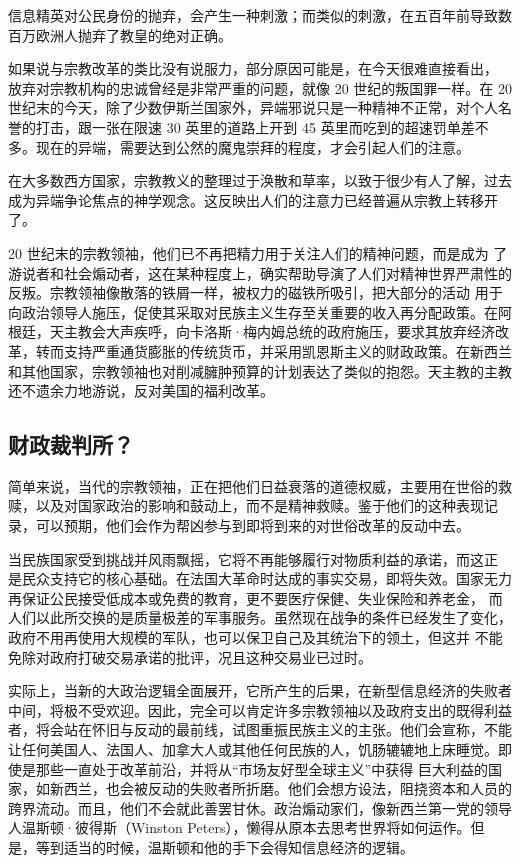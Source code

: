 信息精英对公民身份的抛弃，会产生一种刺激；而类似的刺激，在五百年前导致数百万欧洲人抛弃了教皇的绝对正确。

如果说与宗教改革的类比没有说服力，部分原因可能是，在今天很难直接看出， 放弃对宗教机构的忠诚曾经是非常严重的问题，就像 20 世纪的叛国罪一样。在 20 世纪末的今天，除了少数伊斯兰国家外，异端邪说只是一种精神不正常，对个人名誉的打击，跟一张在限速 30 英里的道路上开到 45 英里而吃到的超速罚单差不多。现在的异端，需要达到公然的魔鬼崇拜的程度，才会引起人们的注意。

在大多数西方国家，宗教教义的整理过于涣散和草率，以致于很少有人了解，过去成为异端争论焦点的神学观念。这反映出人们的注意力已经普遍从宗教上转移开了。

20 世纪末的宗教领袖，他们已不再把精力用于关注人们的精神问题，而是成为 了游说者和社会煽动者，这在某种程度上，确实帮助导演了人们对精神世界严肃性的反叛。宗教领袖像散落的铁屑一样，被权力的磁铁所吸引，把大部分的活动 用于向政治领导人施压，促使其采取对民族主义生存至关重要的收入再分配政策。在阿根廷，天主教会大声疾呼，向卡洛斯·梅内姆总统的政府施压，要求其放弃经济改革，转而支持严重通货膨胀的传统货币，并采用凯恩斯主义的财政政策。在新西兰和其他国家，宗教领袖也对削减臃肿预算的计划表达了类似的抱怨。天主教的主教还不遗余力地游说，反对美国的福利改革。

\subsection{财政裁判所？}
简单来说，当代的宗教领袖，正在把他们日益衰落的道德权威，主要用在世俗的救赎，以及对国家政治的影响和鼓动上，而不是精神救赎。鉴于他们的这种表现记录，可以预期，他们会作为帮凶参与到即将到来的对世俗改革的反动中去。

当民族国家受到挑战并风雨飘摇，它将不再能够履行对物质利益的承诺，而这正 是民众支持它的核心基础。在法国大革命时达成的事实交易，即将失效。国家无力再保证公民接受低成本或免费的教育，更不要医疗保健、失业保险和养老金， 而人们以此所交换的是质量极差的军事服务。虽然现在战争的条件已经发生了变化，政府不用再使用大规模的军队，也可以保卫自己及其统治下的领土，但这并 不能免除对政府打破交易承诺的批评，况且这种交易业已过时。

实际上，当新的大政治逻辑全面展开，它所产生的后果，在新型信息经济的失败者中间，将极不受欢迎。因此，完全可以肯定许多宗教领袖以及政府支出的既得利益者，将会站在怀旧与反动的最前线，试图重振民族主义的主张。他们会宣称，不能让任何美国人、法国人、加拿大人或其他任何民族的人，饥肠辘辘地上床睡觉。即使是那些一直处于改革前沿，并将从“市场友好型全球主义”中获得 巨大利益的国家，如新西兰，也会被反动的失败者所折磨。他们会想方设法，阻挠资本和人员的跨界流动。而且，他们不会就此善罢甘休。政治煽动家们，像新西兰第一党的领导人温斯顿·彼得斯（Winston Peters），懒得从原本去思考世界将如何运作。但是，等到适当的时候，温斯顿和他的手下会得知信息经济的逻辑。


